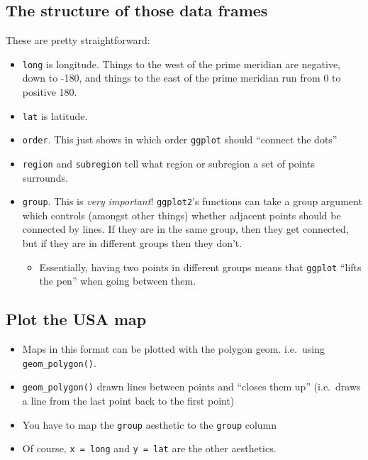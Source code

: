 \documentclass[]{book}
\providecommand{\tightlist}{%
  \setlength{\itemsep}{0pt}\setlength{\parskip}{0pt}}
\theoremstyle{definition}
\theoremstyle{definition}
\theoremstyle{remark}
\begin{document}
\subsection{The structure of those data
frames}\label{the-structure-of-those-data-frames}

These are pretty straightforward:

\begin{itemize}
\tightlist
\item
  \texttt{long} is longitude. Things to the west of the prime meridian
  are negative, down to -180, and things to the east of the prime
  meridian run from 0 to positive 180.
\item
  \texttt{lat} is latitude.
\item
  \texttt{order}. This just shows in which order \texttt{ggplot} should
  ``connect the dots''
\item
  \texttt{region} and \texttt{subregion} tell what region or subregion a
  set of points surrounds.
\item
  \texttt{group}. This is \emph{very important}! \texttt{ggplot2}'s
  functions can take a group argument which controls (amongst other
  things) whether adjacent points should be connected by lines. If they
  are in the same group, then they get connected, but if they are in
  different groups then they don't.

  \begin{itemize}
  \tightlist
  \item
    Essentially, having two points in different groups means that
    \texttt{ggplot} ``lifts the pen'' when going between them.
  \end{itemize}
\end{itemize}

\subsection{Plot the USA map}\label{plot-the-usa-map}

\begin{itemize}
\tightlist
\item
  Maps in this format can be plotted with the polygon geom. i.e.~using
  \texttt{geom\_polygon()}.
\item
  \texttt{geom\_polygon()} drawn lines between points and ``closes them
  up'' (i.e.~draws a line from the last point back to the first point)
\item
  You have to map the \texttt{group} aesthetic to the \texttt{group}
  column
\item
  Of course, \texttt{x\ =\ long} and \texttt{y\ =\ lat} are the other
  aesthetics.
\end{itemize}
\end{document}
